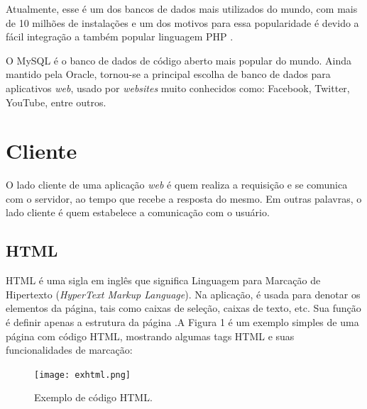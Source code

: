 \documentclass[
	12pt,				%
    oneside,			%
	a4paper,			%
	english,			%
	french,				%
	spanish,			%
	brazil,				%
	]{abntex2}
\begin{document}
Atualmente, esse é um dos bancos de dados mais utilizados do mundo, com mais de
10 milhões de instalações e um dos motivos para essa popularidade é devido a fácil
integração a também popular linguagem PHP \cite{mottin}.

O MySQL é o banco de dados de código aberto mais popular do mundo. Ainda
mantido pela Oracle, tornou-se a principal escolha de banco de dados para aplicativos
\textit{web}, usado por \textit{websites} muito conhecidos como: Facebook, Twitter, YouTube, entre
outros.

\section{Cliente}

O lado cliente de uma aplicação \textit{web} é quem realiza a requisição e se comunica
com o servidor, ao tempo que recebe a resposta do mesmo. Em outras palavras, o
lado cliente é quem estabelece a comunicação com o usuário.

\subsection{HTML}

HTML é uma sigla em inglês que significa Linguagem para Marcação de
Hipertexto (\textit{HyperText Markup Language}). Na aplicação, é usada para denotar os 
elementos da página, tais como caixas de seleção, caixas de texto, etc. Sua função é
definir apenas a estrutura da página \cite{folle}.A Figura 1 é um exemplo simples de uma página com código HTML, mostrando
algumas tags HTML e suas funcionalidades de marcação:

\begin{figure} [hbt] 
\label{figura1} 
\caption{Exemplo de código HTML.}
\begin{center}
\texttt{[image: exhtml.png]} %
\end{center}
\end{figure}
\end{document}
